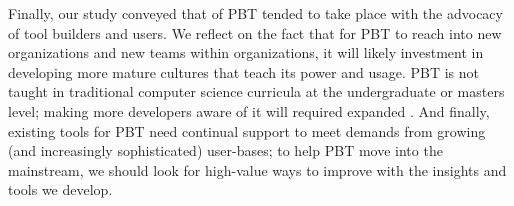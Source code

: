 Finally, our study conveyed that  of PBT tended
to take place with the advocacy of tool builders and users. We reflect
on the fact that for PBT to reach into new organizations and new teams
within organizations, it will likely investment in developing more mature cultures that
teach its power and usage. PBT is
not taught in traditional computer science curricula at the
undergraduate or masters level; making more developers aware of it
will required expanded .
%
And finally, existing tools for PBT need continual support to meet
demands from growing (and increasingly sophisticated) user-bases; to
help PBT move into the mainstream, we should look for high-value ways
to improve  with the insights and
tools we develop.



